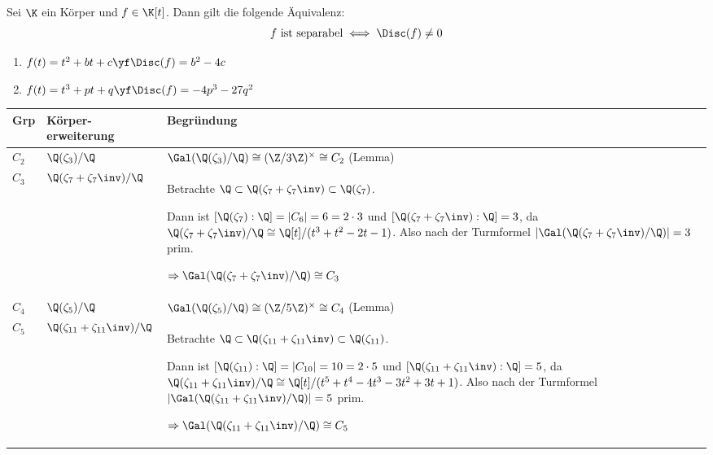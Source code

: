 \documentclass[11pt, a4paper]{article}
\begin{document}
\begin{lemma} \Theorem
    Sei $\K$ ein Körper und $f\in \K[t]$. Dann gilt die folgende Äquivalenz:
    $$f \text{ ist separabel} \iff \Disc(f) \neq 0$$
\end{lemma}

\begin{example}\mbox{}\begin{enumerate}[label = (\roman*)]
    \item $f(t) = t^2 +bt +c \yf \Disc(f) = b^2-4c $
    \item $f(t) = t^3 +pt +q \yf \Disc(f)= -4p^3 -27q^2$
\end{enumerate}
\end{example}


\newpage
\begin{example} \Theorem \mbox{}
\renewcommand{\arraystretch}{1.5}
\begin{table}[H]
\centering
\begin{tabularx}{\textwidth}{|p{1cm}||p{2.9cm}|X|}
\hline
\textbf{Grp} & \textbf{Körper-erweiterung} & \textbf{Begründung} \\
\hline
$C_2$ & $\Q(\zeta_3)/\Q$ & $\Gal(\Q(\zeta_3)/\Q) \cong (\Z/3\Z)^\times \cong C_2$ (Lemma) \\
\hline
$C_3$ & $\Q(\zeta_7 +\zeta_7\inv )/\Q$ & Betrachte $\Q\subset \Q(\zeta_7+\zeta_7\inv ) \subset \Q(\zeta_7)$. \par Dann ist $[\Q(\zeta_7):\Q]= |C_6| = 6 = 2\cdot 3$ und $[\Q(\zeta_7+\zeta_7\inv ):\Q] = 3$, da $\Q(\zeta_7+\zeta_7\inv )/\Q \cong \Q[t]/(t^3+t^2 -2t-1)$. Also nach der Turmformel $|\Gal(\Q(\zeta_7+\zeta_7\inv)/\Q)|= 3$ prim.\par $\Rightarrow \Gal(\Q(\zeta_7+\zeta_7\inv)/\Q) \cong C_3$\\
\hline
$C_4$ & $\Q(\zeta_5)/\Q$ & $\Gal(\Q(\zeta_5)/\Q) \cong (\Z/5\Z)^\times \cong C_4$ (Lemma) \\
\hline
$C_5$ & $\Q(\zeta_{11}+\zeta_{11}\inv)/\Q$ & Betrachte $\Q\subset \Q(\zeta_{11}+\zeta_{11}\inv)\subset\Q(\zeta_{11})$. \par
Dann ist $[\Q(\zeta_{11}):\Q]=|C_{10}|=10=2\cdot5$ und $[\Q(\zeta_{11}+\zeta_{11}\inv):\Q]=5$, da $\Q(\zeta_{11}+\zeta_{11}\inv)/\Q\cong\Q[t]/(t^5+t^4-4t^3-3t^2+3t+1)$. Also nach der Turmformel $|\Gal(\Q(\zeta_{11}+\zeta_{11}\inv)/\Q)|=5$ prim.\par
$\Rightarrow \Gal(\Q(\zeta_{11}+\zeta_{11}\inv)/\Q)\cong C_5$\\

\end{tabularx}
\end{table}
\end{example}
\end{document}
